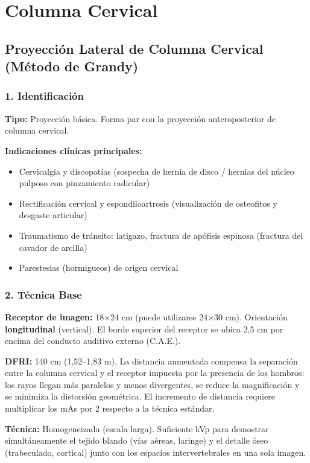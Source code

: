 	\section{Columna Cervical}
		
		\subsection{Proyección Lateral de Columna Cervical (Método de Grandy)}
		
		\subsubsection*{1. Identificación}
		
		\textbf{Tipo:} Proyección básica. Forma par con la proyección anteroposterior de columna cervical.
		
		\textbf{Indicaciones clínicas principales:}
		\begin{itemize}
			\item Cervicalgia y discopatías (sospecha de hernia de disco / hernias del núcleo pulposo con pinzamiento radicular)
			\item Rectificación cervical y espondiloartrosis (visualización de osteofitos y desgaste articular)
			\item Traumatismo de tránsito: latigazo, fractura de apófisis espinosa (fractura del cavador de arcilla)
			\item Parestesias (hormigueos) de origen cervical
		\end{itemize}
		
		\subsubsection*{2. Técnica Base}
		
		\textbf{Receptor de imagen:} 18$\times$24 cm (puede utilizarse 24$\times$30 cm). Orientación \textbf{longitudinal} (vertical). El borde superior del receptor se ubica 2,5 cm por encima del conducto auditivo externo (C.A.E.).
		
		\textbf{DFRI:} 140 cm (1,52--1,83 m). La distancia aumentada compensa la separación entre la columna cervical y el receptor impuesta por la presencia de los hombros: los rayos llegan más paralelos y menos divergentes, se reduce la magnificación y se minimiza la distorsión geométrica. El incremento de distancia requiere multiplicar los mAs por 2 respecto a la técnica estándar.
		
		\textbf{Técnica:} Homogeneizada (escala larga). Suficiente kVp para demostrar simultáneamente el tejido blando (vías aéreas, laringe) y el detalle óseo (trabeculado, cortical) junto con los espacios intervertebrales en una sola imagen.
		
